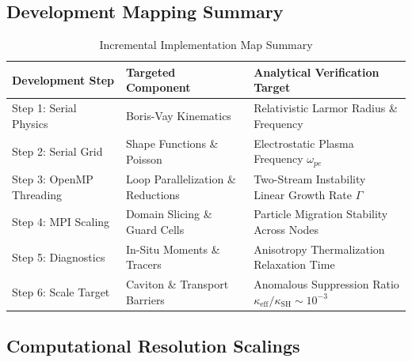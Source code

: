 \documentclass[11pt,a4paper]{article}
\begin{document}
\subsection{Development Mapping Summary}
\begin{table}[h]
\centering
\caption{Incremental Implementation Map Summary}
\begin{tabular}{lll}
\toprule
\textbf{Development Step} & \textbf{Targeted Component} & \textbf{Analytical Verification Target} \\
\midrule
Step 1: Serial Physics & Boris-Vay Kinematics & Relativistic Larmor Radius \& Frequency \\
Step 2: Serial Grid & Shape Functions \& Poisson & Electrostatic Plasma Frequency \(\omega_{pe}\) \\
Step 3: OpenMP Threading & Loop Parallelization \& Reductions & Two-Stream Instability Linear Growth Rate \(\Gamma\) \\
Step 4: MPI Scaling & Domain Slicing \& Guard Cells & Particle Migration Stability Across Nodes \\
Step 5: Diagnostics & In-Situ Moments \& Tracers & Anisotropy Thermalization Relaxation Time \\
Step 6: Scale Target & Caviton \& Transport Barriers & Anomalous Suppression Ratio \(\kappa_{\text{eff}} / \kappa_{\text{SH}} \sim 10^{-3}\) \\
\bottomrule
\end{tabular}
\end{table}

\subsection{Computational Resolution Scalings}
\end{document}
